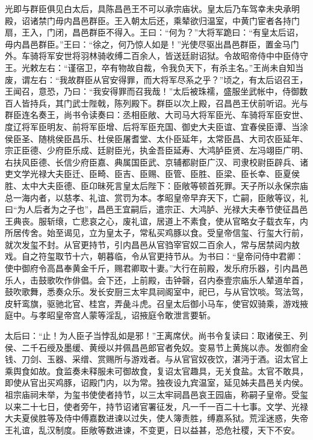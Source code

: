 \documentclass[12pt,UTF8]{ctexbook}
\begin{document}
光即与群臣俱见白太后，具陈昌邑王不可以承宗庙状。皇太后乃车驾幸未央承明殿，诏诸禁门毋内昌邑群臣。王入朝太后还，乘辇欲归温室，中黄门宦者各持门扇，王入，门闭，昌邑群臣不得入。王曰：“何为？”大将军跪曰：“有皇太后诏，毋内昌邑群臣。”王曰：“徐之，何乃惊人如是！”光使尽驱出昌邑群臣，置金马门外。车骑将军安世将羽林骑收缚二百余人，皆送廷尉诏狱。令故昭帝侍中中臣侍守王。光敕左右：“谨宿卫，卒有物故自裁，令我负天下，有杀主名。”王尚未自知当废，谓左右：“我故群臣从官安得罪，而大将军尽系之乎？”顷之，有太后诏召王，王闻召，意恐，乃曰：“我安得罪而召我哉！”太后被珠襦，盛服坐武帐中，侍御数百人皆持兵，其门武士陛戟，陈列殿下。群臣以次上殿，召昌邑王伏前听诏。光与群臣连名奏王，尚书令读奏曰：丞相臣敞、大司马大将军臣光、车骑将军臣安世、度辽将军臣明友、前将军臣增、后将军臣充国、御史大夫臣谊、宜春侯臣谭、当涂侯臣圣、随桃侯臣昌乐、杜侯臣屠耆堂、太仆臣延年，太常臣昌、大司农臣延年、宗正臣德、少府臣乐成、廷尉臣光，执金吾臣延寿、大鸿胪臣贤、左冯翊臣广明、右扶风臣德、长信少府臣嘉、典属国臣武、京辅都尉臣广汉、司隶校尉臣辟兵、诸吏文学光禄大夫臣迁、臣畸、臣吉、臣赐、臣管、臣胜、臣梁、臣长幸、臣夏侯胜、太中大夫臣德、臣卬昧死言皇太后陛下：臣敞等顿首死罪。天子所以永保宗庙总一海内者，以慈孝、礼谊、赏罚为本。孝昭皇帝早弃天下，亡嗣，臣敞等议，礼曰“为人后者为之子也”，昌邑王宜嗣后，遣宗正、大鸿胪、光禄大夫奉节使征昌邑王典丧。服斩缞，亡悲哀之心，废礼谊，居道上不素食，使从官略女子载衣车，内所居传舍。始至谒见，立为皇太子，常私买鸡豚以食。受皇帝信玺、行玺大行前，就次发玺不封。从官更持节，引内昌邑从官驺宰官奴二百余人，常与居禁闼内敖戏。自之符玺取节十六，朝暮临，令从官更持节从。为书曰：“皇帝问侍中君卿：使中御府令高昌奉黄金千斤，赐君卿取十妻。”大行在前殿，发乐府乐器，引内昌邑乐人，击鼓歌吹作俳倡。会下还，上前殿，击钟磬，召内泰壹宗庙乐人辇道牟首，鼓吹歌舞，悉奏众乐。发长安厨三太牢具祠阁室中，祀已，与从官饮啖。驾法驾，皮轩鸾旗，驱驰北官、桂宫，弄彘斗虎。召皇太后御小马车，使官奴骑乘，游戏掖庭中。与孝昭皇帝宫人蒙等淫乱，诏掖庭令敢泄言要斩。



太后曰：“止！为人臣子当悖乱如是邪！”王离席伏。尚书令复读曰：取诸侯王、列侯、二千石绶及墨缓、黄绶以并佩昌邑郎官者免奴。变易节上黄旄以赤。发御府金钱、刀剑、玉器、采缯、赏赐所与游戏者。与从官官奴夜饮，湛沔于酒。诏太官上乘舆食如故。食监奏未释服未可御故食，复诏太官趣具，无关食盐。太官不敢具，即使从官出买鸡豚，诏殿门内，以为常。独夜设九宾温室，延见姊夫昌邑关内侯。祖宗庙祠未举，为玺书使使者持节，以三太牢祠昌邑哀王园庙，称嗣子皇帝。受玺以来二十七日，使者旁午，持节诏诸官署征发，凡一千一百二十七事。文学、光禄大夫夏侯胜等及侍中傅嘉数进谏以过失，使人簿责胜，缚嘉系狱。荒淫迷惑，失帝王礼谊，乱汉制度。臣敞等数进谏，不变更，日以益甚，恐危社稷，天下不安。
\end{document}
